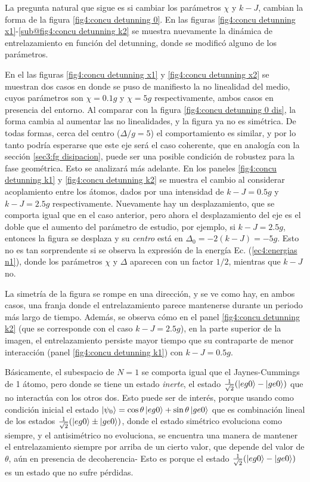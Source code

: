 La pregunta natural que sigue es si cambiar los parámetros $\chi$ y $k-J$, cambian la forma de la figura \ref{fig4:concu detunning 0}. En las figuras \ref{fig4:concu detunning x1}-\ref{sub@fig4:concu detunning k2} se muestra nuevamente la dinámica de entrelazamiento en función del detunning, donde se modificó alguno de los parámetros.

En el las figuras \ref{fig4:concu detunning x1} y \ref{fig4:concu detunning x2} se muestran dos casos en donde se puso de manifiesto la no linealidad del medio, cuyos parámetros son $\chi=0.1g$ y $\chi=5g$ respectivamente, ambos casos en presencia del entorno. Al comparar con la figura \ref{fig4:concu detunning 0 dis}, la forma cambia al aumentar las no linealidades, y la figura ya no es simétrica. De todas formas, cerca del centro ($\Delta/g=5$) el comportamiento es similar, y por lo tanto podría esperarse que este eje será el caso coherente, que en analogía con la sección \ref{sec3:fg disipacion}, puede ser una posible condición de robustez para la fase geométrica. Esto se analizará más adelante. En los paneles \ref{fig4:concu detunning k1} y \ref{fig4:concu detunning k2} se muestra el cambio al considerar acoplamiento entre los átomos, dados por una intensidad de $k-J=0.5g$ y $k-J=2.5g$ respectivamente. Nuevamente hay un desplazamiento, que se comporta igual que en el caso anterior, pero ahora el desplazamiento del eje es el doble que el aumento del parámetro de estudio, por ejemplo, si $k-J=2.5g$, entonces la figura se desplaza y su \textit{centro} está en $\Delta_0=-2(k-J)=-5g$. Esto no es tan sorprendente si se observa la expresión de la energía Ec. (\ref{ec4:energias n1}), donde los parámetros $\chi$ y $\Delta$ aparecen con un factor $1/2$, mientras que $k-J$ no. 

La simetría de la figura se rompe en una dirección, y se ve como hay, en ambos casos, una franja donde el entrelazamiento parece mantenerse durante un periodo más largo de tiempo. Además, se observa cómo en el panel \ref{fig4:concu detunning k2} (que se corresponde con el caso $k-J=2.5g$), en la parte superior de la imagen, el entrelazamiento persiste mayor tiempo que su contraparte de menor interacción (panel \ref{fig4:concu detunning k1}) con $k-J=0.5g$.

Básicamente, el subespacio de $N=1$ se comporta igual que el Jaynes-Cummings de 1 átomo, pero donde se tiene un estado \textit{inerte}, el estado $\frac{1}{\sqrt{2}}(\ket{eg0}-\ket{ge0})$ que no interactúa con los otros dos. Esto puede ser de interés, porque usando como condición inicial el estado $\ket{\psi_0}=\cos\theta\ket{eg0}+\sin\theta\ket{ge0}$ que es combinación lineal de los estados $\frac{1}{\sqrt{2}}(\ket{eg0}\pm\ket{ge0})$, donde el estado simétrico evoluciona como siempre, y el antisimétrico no evoluciona, se encuentra una manera de mantener el entrelazamiento siempre por arriba de un cierto valor, que depende del valor de $\theta$, aún en presencia de decoherencia- Esto es porque el estado $\frac{1}{\sqrt{2}}(\ket{eg0}-\ket{ge0})$ es un estado que no sufre pérdidas.

